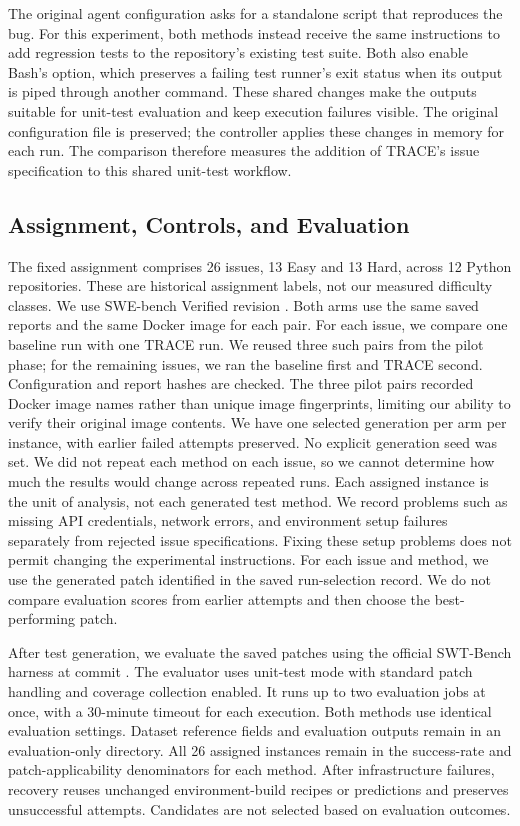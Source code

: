 The original agent configuration asks for a standalone script that reproduces the bug. For this experiment, both methods instead receive the same instructions to add regression tests to the repository's existing test suite. Both also enable Bash's  option, which preserves a failing test runner's exit status when its output is piped through another command. These shared changes make the outputs suitable for unit-test evaluation and keep execution failures visible. The original configuration file is preserved; the controller applies these changes in memory for each run. The comparison therefore measures the addition of TRACE's issue specification to this shared unit-test workflow.

\subsection{Assignment, Controls, and Evaluation}
The fixed assignment comprises 26 issues, 13 Easy and 13 Hard, across 12 Python repositories. These are historical assignment labels, not our measured difficulty classes. We use SWE-bench Verified revision . Both arms use the same saved reports and the same Docker image for each pair. For each issue, we compare one baseline run with one TRACE run. We reused three such pairs from the pilot phase; for the remaining issues, we ran the baseline first and TRACE second. Configuration and report hashes are checked. The three pilot pairs recorded Docker image names rather than unique image fingerprints, limiting our ability to verify their original image contents. We have one selected generation per arm per instance, with earlier failed attempts preserved. No explicit generation seed was set. We did not repeat each method on each issue, so we cannot determine how much the results would change across repeated runs. Each assigned instance is the unit of analysis, not each generated test method. We record problems such as missing API credentials, network errors, and environment setup failures separately from rejected issue specifications. Fixing these setup problems does not permit changing the experimental instructions. For each issue and method, we use the generated patch identified in the saved run-selection record. We do not compare evaluation scores from earlier attempts and then choose the best-performing patch.

After test generation, we evaluate the saved patches using the official SWT-Bench harness at commit . The evaluator uses unit-test mode with standard patch handling and coverage collection enabled. It runs up to two evaluation jobs at once, with a 30-minute timeout for each execution. Both methods use identical evaluation settings. Dataset reference fields and evaluation outputs remain in an evaluation-only directory. All 26 assigned instances remain in the success-rate and patch-applicability denominators for each method. After infrastructure failures, recovery reuses unchanged environment-build recipes or predictions and preserves unsuccessful attempts. Candidates are not selected based on evaluation outcomes.

